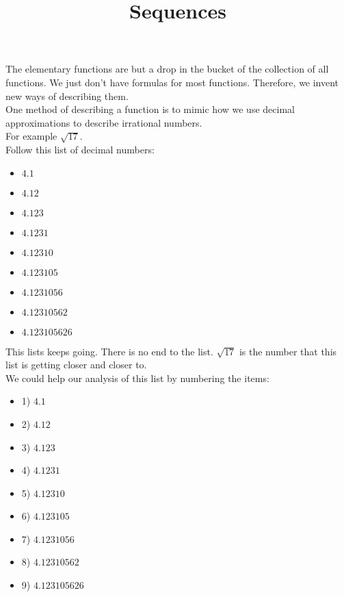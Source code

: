 \documentclass{ximera}
\title{Sequences}
\begin{document}
\begin{abstract}
\end{abstract}

\maketitle





The elementary functions are but a drop in the bucket of the collection of all functions.  We just don't have formulas for most functions.  Therefore, we invent new ways of describing them. \\


One method of describing a function is to mimic how we use decimal approximations to describe irrational numbers. \\


For example $\sqrt{17}$. \\

Follow this list of decimal numbers:


\begin{itemize}
\item $4.1$
\item $4.12$
\item $4.123$
\item $4.1231$
\item $4.12310$
\item $4.123105$
\item $4.1231056$
\item $4.12310562$
\item $4.123105626$
\end{itemize}


This lists keeps going.  There is no end to the list.  $\sqrt{17}$ is the number that this list is getting closer and closer to. \\



We could help our analysis of this list by numbering the items:

\begin{itemize}
\item 1) $4.1$
\item 2) $4.12$
\item 3) $4.123$
\item 4) $4.1231$
\item 5) $4.12310$
\item 6) $4.123105$
\item 7) $4.1231056$
\item 8) $4.12310562$
\item 9) $4.123105626$
\end{itemize}
\end{document}
